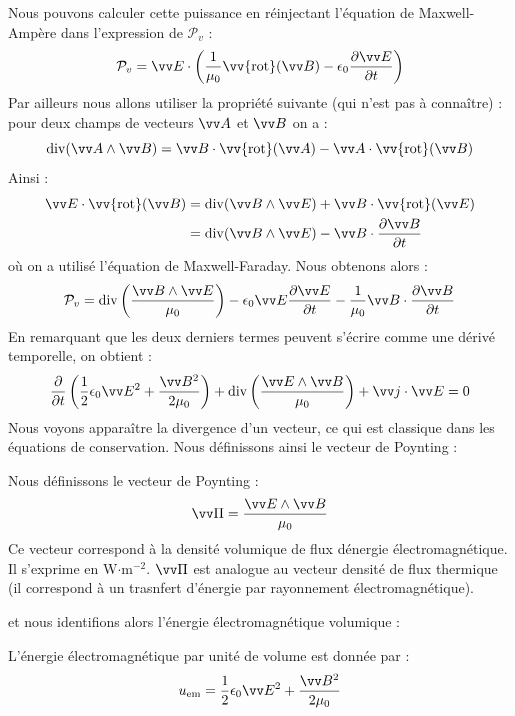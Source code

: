 \documentclass[11pt,fleqn]{book} %
\renewcommand{\div}{\mathrm{div}}
\newcommand{\rot}{\vv{\mathrm{rot}}}
\begin{document}
Nous pouvons calculer cette puissance en réinjectant l'équation de Maxwell-Ampère dans l'expression de $\mathcal{P}_v$ :
\begin{equation}
	\mathcal{P}_v = \vv E \cdot \left( \frac{1}{\mu_0} \rot(\vv B) - \epsilon_0 \frac{\partial \vv E}{\partial t} \right)
\end{equation}
Par ailleurs nous allons utiliser la propriété suivante (qui n'est pas à connaître) : pour deux champs de vecteurs $\vv A$ et $\vv B$ on a :
\begin{equation}
	\div(\vv A \wedge \vv B) = \vv B \cdot \rot(\vv A) - \vv A \cdot \rot(\vv B)
\end{equation}
Ainsi :
\begin{align}
	\vv E \cdot \rot(\vv B) &= \div(\vv B \wedge \vv E) + \vv B \cdot \rot(\vv E) \\
	&= \div(\vv B \wedge \vv E) - \vv B \cdot \dfrac{\partial \vv B}{\partial t}
\end{align}
où on a utilisé l'équation de Maxwell-Faraday. Nous obtenons alors :
\begin{equation}
	\mathcal{P}_v = \div \left( \frac{\vv B \wedge \vv E}{\mu_0} \right) - \epsilon_0 \vv E \frac{\partial \vv E}{\partial t} - \frac{1}{\mu_0} \vv B \cdot \dfrac{\partial \vv B}{\partial t}
\end{equation}
En remarquant que les deux derniers termes peuvent s'écrire comme une dérivé temporelle, on obtient :
\begin{equation}
	\frac{\partial}{\partial t} \left( \frac{1}{2} \epsilon_0 \vv E^2 + \frac{\vv B^2}{2 \mu_0} \right) + \div \left(  \frac{\vv E \wedge \vv B}{\mu_0} \right) + \vv j \cdot \vv E = 0
\end{equation}
Nous voyons apparaître la divergence d'un vecteur, ce qui est classique dans les équations de conservation. Nous définissons ainsi le vecteur de Poynting :
\begin{definition}
	Nous définissons le vecteur de Poynting :
	\begin{equation}
		\vv \Pi = \frac{\vv E \wedge \vv B}{\mu_0}
	\end{equation}
	Ce vecteur correspond à la densité volumique de flux dénergie électromagnétique. Il s'exprime en W$\cdot$m$^{-2}$. $\vv \Pi$ est analogue au vecteur densité de flux thermique (il correspond à un trasnfert d'énergie par rayonnement électromagnétique).
\end{definition}
et nous identifions alors l'énergie électromagnétique volumique :
\begin{proposition}
	L'énergie électromagnétique par unité de volume est donnée par :
	\begin{equation}
		u_{\rm em} = \frac{1}{2} \epsilon_0 \vv E^2 + \frac{\vv B^2}{2 \mu_0}
	\end{equation}
\end{proposition}
\end{document}
